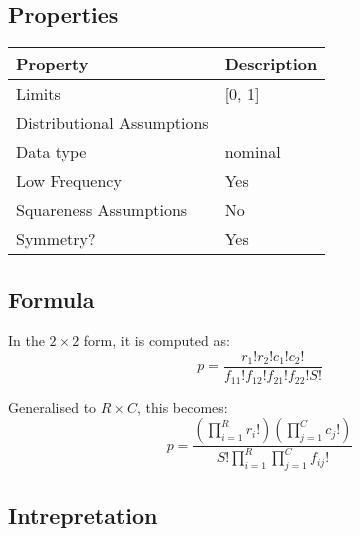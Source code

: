 \documentclass[11pt]{article}
\begin{document}
\subsection{Properties}
\begin{tabular}{| l || l |}
    \hline
    {\bf Property} & {\bf Description} \\
    \hline
    Limits & [0, 1] \\ \hline

    Distributional Assumptions&  \\ \hline

    Data type & nominal \\ \hline

    Low Frequency & Yes \\ \hline

    Squareness Assumptions & No \\ \hline
    
    Symmetry? & Yes \\ \hline

\end{tabular}


\subsection{Formula}
In the $2\times 2$ form, it is computed as:
$$
p = \frac{ r_1!r_2!c_1!c_2! }{ f_{11}!f_{12}!f_{21}!f_{22}!S! }
$$

Generalised to $R\times C$, this becomes:
$$
p = \frac{ (\prod_{i=1}^{R}{ r_i! })  (\prod_{j=1}^{C}{ c_j! }) }{ S! \prod_{i=1}^{R}{  \prod_{j=1}^{C}{ f_{ij}! }}    }
$$

\subsection{Intrepretation}
\end{document}
